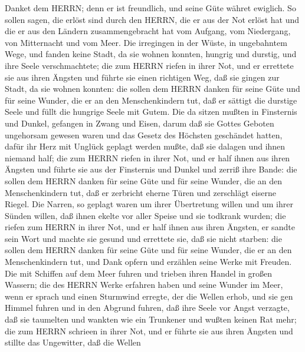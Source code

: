  Danket dem HERRN; denn er ist freundlich, und seine Güte
währet ewiglich.  So sollen sagen, die erlöst sind durch den
HERRN, die er aus der Not erlöst hat  und die er aus den
Ländern zusammengebracht hat vom Aufgang, vom Niedergang, von
Mitternacht und vom Meer.  Die irregingen in der Wüste, in
ungebahntem Wege, und fanden keine Stadt, da sie wohnen konnten,
 hungrig und durstig, und ihre Seele verschmachtete;
 die zum HERRN riefen in ihrer Not, und er errettete sie aus
ihren Ängsten  und führte sie einen richtigen Weg, daß sie
gingen zur Stadt, da sie wohnen konnten:  die sollen dem
HERRN danken für seine Güte und für seine Wunder, die er an den
Menschenkindern tut,  daß er sättigt die durstige Seele und
füllt die hungrige Seele mit Gutem.  Die da sitzen mußten
in Finsternis und Dunkel, gefangen in Zwang und Eisen, 
darum daß sie Gottes Geboten ungehorsam gewesen waren und das Gesetz des
Höchsten geschändet hatten,  dafür ihr Herz mit Unglück
geplagt werden mußte, daß sie dalagen und ihnen niemand half;
 die zum HERRN riefen in ihrer Not, und er half ihnen aus
ihren Ängsten  und führte sie aus der Finsternis und Dunkel
und zerriß ihre Bande:  die sollen dem HERRN danken für
seine Güte und für seine Wunder, die an den Menschenkindern tut,
 daß er zerbricht eherne Türen und zerschlägt eiserne
Riegel.  Die Narren, so geplagt waren um ihrer Übertretung
willen und um ihrer Sünden willen,  daß ihnen ekelte vor
aller Speise und sie todkrank wurden;  die riefen zum HERRN
in ihrer Not, und er half ihnen aus ihren Ängsten,  er
sandte sein Wort und machte sie gesund und errettete sie, daß sie nicht
starben:  die sollen dem HERRN danken für seine Güte und
für seine Wunder, die er an den Menschenkindern tut,  und
Dank opfern und erzählen seine Werke mit Freuden.  Die mit
Schiffen auf dem Meer fuhren und trieben ihren Handel in großen Wassern;
 die des HERRN Werke erfahren haben und seine Wunder im
Meer,  wenn er sprach und einen Sturmwind erregte, der die
Wellen erhob,  und sie gen Himmel fuhren und in den Abgrund
fuhren, daß ihre Seele vor Angst verzagte,  daß sie
taumelten und wankten wie ein Trunkener und wußten keinen Rat mehr;
 die zum HERRN schrieen in ihrer Not, und er führte sie aus
ihren Ängsten  und stillte das Ungewitter, daß die Wellen
